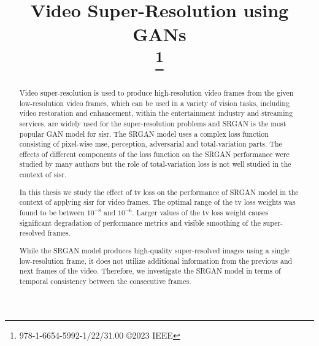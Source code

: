 \documentclass[conference]{IEEEtran}
\begin{document}
\title{Video Super-Resolution using GANs\\
\thanks{978-1-6654-5992-1/22/31.00 ©2023 IEEE}
}

\author{
}

\graphicspath{{./img/}}

\maketitle


\begin{abstract}
    Video super-resolution is used to produce high-resolution video frames from the given low-resolution video frames, which can be used in a variety of vision tasks, including video restoration and enhancement, within the entertainment industry and streaming services.  are widely used for the super-resolution problems and SRGAN \cite{srgan_2016} is the most popular GAN model for \acrfull{sisr}. The SRGAN model uses a complex loss function consisting of pixel-wise \acrfull{mse}, perception, adversarial and total-variation parts. The effects of different components of the loss function on the SRGAN performance were studied by many authors \cite{esrgan_2018,srgan_2016,weighted_srgan_2021} but the role of total-variation loss is not well studied in the context of \acrshort{sisr}.

    In this thesis we study the effect of \acrfull{tv} loss on the performance of SRGAN model in the context of applying \acrlong{sisr} for video frames. The optimal range of the \acrshort{tv} loss weights was found to be between $10^{-8}$ and $10^{-6}$. Larger values of the \acrshort{tv} loss weight causes significant degradation of performance metrics and visible smoothing of the super-resolved frames.

    While the SRGAN model produces high-quality super-resolved images using a single low-resolution frame, it does not utilize additional information from the previous and next frames of the video. Therefore, we investigate the SRGAN model in terms of temporal consistency between the consecutive frames.

\end{abstract}
\end{document}
